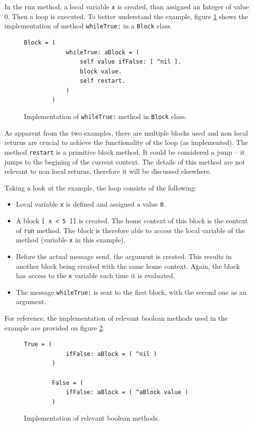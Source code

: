 \documentclass[thesis=M,english]{FITthesis}[2019/12/23]
\begin{document}
In the run method, a local variable \texttt{x} is created, than assigned an Integer of value 0. Then a loop is
executed. To better understand the example, figure \ref{fig:block_whileTrue} shows the implementation of method \texttt{whileTrue:} in a
\texttt{Block} class.

\begin{figure}[h!]
	\centering
	\begin{lstlisting}[language=Smalltalk]
		Block = (
			whileTrue: aBlock = (
				self value ifFalse: [ ^nil ].
				block value.
				self restart.
			)
		)
	\end{lstlisting}
	\caption{Implementation of \texttt{whileTrue:} method in \texttt{Block} class.}
	\label{fig:block_whileTrue}
\end{figure}

As apparent from the two examples, there are multiple blocks used and non local returns are crucial to achieve the functionality of the loop
(as implemented). The method \texttt{restart} is a primitive block method. It could be considered a jump -- it jumps to the begining of the current
context. The details of this method are not relevant to non local returns, therefore it will be discussed elsewhere.

Taking a look at the example, the loop consists of the following:
\begin{itemize}
	\item Local variable \texttt{x} is defined and assigned a value \texttt{0}.
	\item A block \texttt{[ x < 5 ]]} is created. The home context of this block is the context of \texttt{run} method. The block is therefore
		able to access the local variable of the method (variable \texttt{x} in this example).
	\item Before the actual message send, the argument is created. This results in another block being created with the same home context. Again, the block
		has access to the \texttt{x} variable each time it is evaluated.
	\item The message \texttt{whileTrue:} is sent to the first block, with the second one as an argument.
\end{itemize}

For reference, the implementation of relevant boolean methods used in the example are provided on figure \ref{fig:bool_ifFalse}.
\begin{figure}[h!]
	\begin{lstlisting}[language=Smalltalk]
		True = (
			ifFalse: aBlock = ( ^nil )
		)

		False = (
			ifFalse: aBlock = ( ^aBlock value )
		)
	\end{lstlisting}
	\caption{Implementation of relevant boolean methods.}
	\label{fig:bool_ifFalse}
\end{figure}
\end{document}
